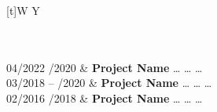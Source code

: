 \begin{xltabular}{\textwidth}[t]{W Y}

 \hrulefill \\ \\ 

04/2022 /2020 			&	\textbf{Project Name} \newline
						\dots \newline
						\dots \newline
						\dots \newline
						\\
					
03/2018 – /2020 			&	\textbf{Project Name} \newline
						\dots \newline
						\dots \newline
						\dots \newline
						\\
					
02/2016 /2018 			&	\textbf{Project Name} \newline
						\dots \newline
						\dots \newline
						\dots \newline
						\\

\end{xltabular}